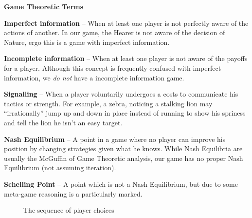 \documentclass{article}
\begin{document}
\begin{framed}
	\small

	\textbf{Game Theoretic Terms}

	\textbf{Imperfect information} -- When at least one player is not perfectly aware of the actions of another. In our game, the Hearer is not aware of the decision of Nature, ergo this is a game with imperfect information.

	\textbf{Incomplete information} -- When at least one player is not aware of the payoffs for a player. Although this concept is frequently confused with imperfect information, we \emph{do not} have a incomplete information game.

	\textbf{Signalling} -- When a player voluntarily undergoes a costs to communicate his tactics or strength. For example, a zebra, noticing a stalking lion may ``irrationally'' jump up and down in place instead of running to show his spriness and tell the lion he isn't an easy target.

	\textbf{Nash Equilibrium} -- A point in a game where no player can improve his position by changing strategies given what he knows. While Nash Equilibria are usually the McGuffin of Game Theoretic analysis, our game has no proper Nash Equilibrium (not assuming iteration).

	\textbf{Schelling Point} -- A point which is not a Nash Equilibrium, but due to some meta-game reasoning is a particularly marked.
\end{framed}


\begin{figure}
\begin{center}
\end{center}
	\caption{The sequence of player choices\label{seq}}
\end{figure}
\end{document}
